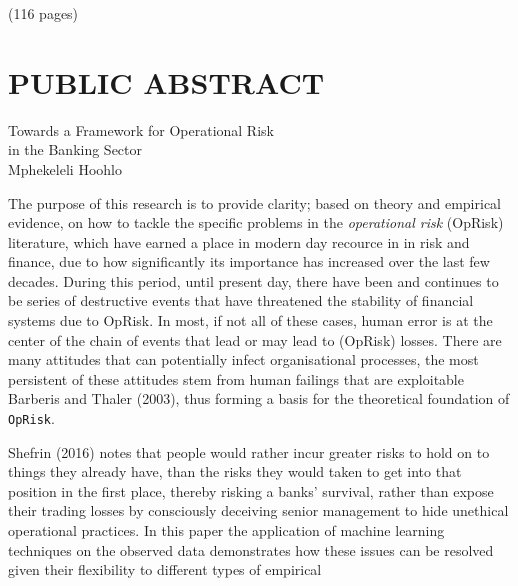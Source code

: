 \documentclass[]{DissertateUSU}
\begin{document}
\hspace{11 cm} (116 pages)

\singlespacing

\newpage

 \fancyhead[R]{\thepage} \fancyfoot[C]{}
\chapter*{PUBLIC ABSTRACT}

\doublespacing

\begin{center}
Towards a Framework for Operational Risk \\ 
in the Banking Sector \\
Mphekeleli Hoohlo
\end{center}

\vspace{12pt}

The purpose of this research is to provide clarity; based on theory and
empirical evidence, on how to tackle the specific problems in the
\emph{operational risk} (OpRisk) literature, which have earned a place
in modern day recource in in risk and finance, due to how significantly
its importance has increased over the last few decades. During this
period, until present day, there have been and continues to be series of
destructive events that have threatened the stability of financial
systems due to OpRisk. In most, if not all of these cases, human error
is at the center of the chain of events that lead or may lead to
(OpRisk) losses. There are many attitudes that can potentially infect
organisational processes, the most persistent of these attitudes stem
from human failings that are exploitable Barberis and Thaler (2003),
thus forming a basis for the theoretical foundation of \texttt{OpRisk}.

Shefrin (2016) notes that people would rather incur greater risks to
hold on to things they already have, than the risks they would taken to
get into that position in the first place, thereby risking a banks'
survival, rather than expose their trading losses by consciously
deceiving senior management to hide unethical operational practices. In
this paper the application of machine learning techniques on the
observed data demonstrates how these issues can be resolved given their
flexibility to different types of empirical

\singlespacing
\end{document}
